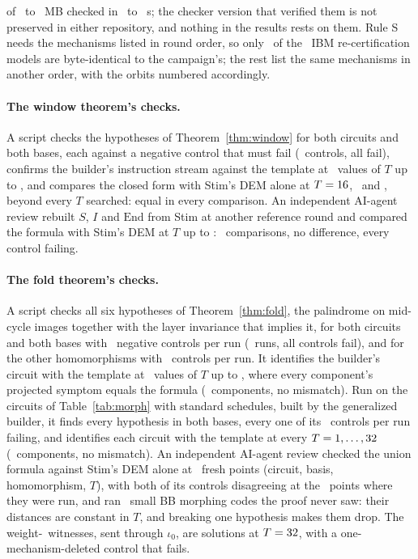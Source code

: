 \documentclass[aps,pra,twocolumn,superscriptaddress,nofootinbib,longbibliography,floatfix]{revtex4-2}
\begin{document}
of \IbmProofMBLo\ to \IbmProofMBHi~MB checked in \IbmCheckSLo\ to \IbmCheckSHi~s; the checker version that verified them is not preserved in either repository, and nothing in the results rests on them. Rule S needs the mechanisms listed in round order, so only \IbmRecertSame\ of the \IbmRecertCerts\ IBM re-certification models are byte-identical to the campaign's; the rest list the same mechanisms in another order, with the orbits numbered accordingly.


\paragraph*{The window theorem's checks.} A script checks the hypotheses of Theorem~\ref{thm:window} for both circuits and both bases, each against a negative control that must fail (\WinControls\ controls, all fail), confirms the builder's instruction stream against the template at \WinTplCount\ values of $T$ up to \WinTplTmax, and compares the closed form with Stim's DEM alone at $T=16$, \WinStimTb\ and \WinStimTc, beyond every $T$ searched: equal in every comparison. An independent AI-agent review rebuilt $S$, $I$ and $\mathrm{End}$ from Stim at another reference round and compared the formula with Stim's DEM at $T$ up to \WinAuditTmax: \WinAuditCmp\ comparisons, no difference, every control failing.

\paragraph*{The fold theorem's checks.} A script checks all six hypotheses of Theorem~\ref{thm:fold}, the palindrome on mid-cycle images together with the layer invariance that implies it, for both circuits and both bases with \FoldControls\ negative controls per run (\FoldRuns\ runs, all controls fail), and for the other homomorphisms with \FoldOtherControls\ controls per run. It identifies the builder's circuit with the template at \FoldTplCount\ values of $T$ up to \FoldTplTmax, where every component's projected symptom equals the formula (\FoldComponents\ components, no mismatch). Run on the circuits of Table~\ref{tab:morph} with standard schedules, built by the generalized builder, it finds every hypothesis in both bases, every one of its \MtwoFoldControls\ controls per run failing, and identifies each circuit with the template at every $T=1,\dots,32$ (\MtwoTplComponents\ components, no mismatch). An independent AI-agent review checked the union formula against Stim's DEM alone at \FoldAuditPoints\ fresh points (circuit, basis, homomorphism, $T$), with both of its controls disagreeing at the \FoldAuditCtlPoints\ points where they were run, and ran \FoldAuditCodes\ small BB morphing codes the proof never saw: their distances are constant in $T$, and breaking one hypothesis makes them drop. The weight-\MorphBigD\ witnesses, sent through $\iota_0$, are solutions at $T=32$, with a one-mechanism-deleted control that fails.
\end{document}
